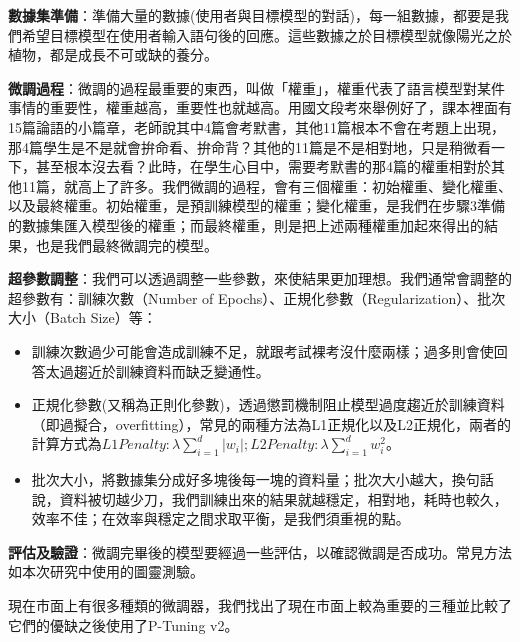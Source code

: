 \documentclass[8pt,a4paper,新細明體,UTF8,natbib]{article}
\begin{document}
\begin{CJK*}{UTF8}{bsmi}
	\textbf{數據集準備}：準備大量的數據(使用者與目標模型的對話)，每一組數據，都要是我們希望目標模型在使用者輸入語句後的回應。這些數據之於目標模型就像陽光之於植物，都是成長不可或缺的養分。

	\textbf{微調過程}：微調的過程最重要的東西，叫做「權重」，權重代表了語言模型對某件事情的重要性，權重越高，重要性也就越高。用國文段考來舉例好了，課本裡面有15篇論語的小篇章，老師說其中4篇會考默書，其他11篇根本不會在考題上出現，那4篇學生是不是就會拚命看、拚命背？其他的11篇是不是相對地，只是稍微看一下，甚至根本沒去看？此時，在學生心目中，需要考默書的那4篇的權重相對於其他11篇，就高上了許多。我們微調的過程，會有三個權重：初始權重、變化權重、以及最終權重。初始權重，是預訓練模型的權重；變化權重，是我們在步驟3準備的數據集匯入模型後的權重；而最終權重，則是把上述兩種權重加起來得出的結果，也是我們最終微調完的模型。

	\textbf{超參數調整}：我們可以透過調整一些參數，來使結果更加理想。我們通常會調整的超參數有：訓練次數（Number of Epochs）、正規化參數（Regularization）、批次大小（Batch Size）等：
	\begin{itemize}
		\item 訓練次數過少可能會造成訓練不足，就跟考試裸考沒什麼兩樣；過多則會使回答太過趨近於訓練資料而缺乏變通性。
		\item 正規化參數(又稱為正則化參數)，透過懲罰機制阻止模型過度趨近於訓練資料（即過擬合，overfitting），常見的兩種方法為L1正規化以及L2正規化，兩者的計算方式為$L1 Penalty:\lambda\sum_{i=1}^{d}|w_i|;L2 Penalty:\lambda\sum_{i=1}^{d}w^2_i$。
		\item 批次大小，將數據集分成好多塊後每一塊的資料量；批次大小越大，換句話說，資料被切越少刀，我們訓練出來的結果就越穩定，相對地，耗時也較久，效率不佳；在效率與穩定之間求取平衡，是我們須重視的點。
	\end{itemize}

	\textbf{評估及驗證}：微調完畢後的模型要經過一些評估，以確認微調是否成功。常見方法如本次研究中使用的圖靈測驗。
	
	現在市面上有很多種類的微調器，我們找出了現在市面上較為重要的三種並比較了它們的優缺之後使用了P-Tuning v2。
	


\end{CJK*}
\end{document}
